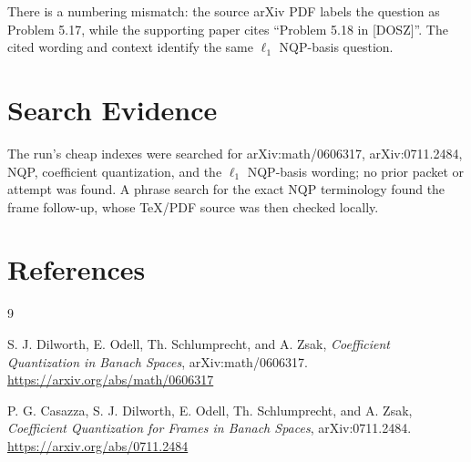 \documentclass[11pt]{article}
\begin{document}
There is a numbering mismatch: the source arXiv PDF labels the question as
Problem 5.17, while the supporting paper cites ``Problem 5.18 in [DOSZ]''.
The cited wording and context identify the same \(\ell_1\) NQP-basis question.

\section*{Search Evidence}

The run's cheap indexes were searched for arXiv:math/0606317, arXiv:0711.2484,
NQP, coefficient quantization, and the \(\ell_1\) NQP-basis wording; no prior
packet or attempt was found. A phrase search for the exact NQP terminology
found the frame follow-up, whose TeX/PDF source was then checked locally.

\section*{References}

\begin{thebibliography}{9}

S. J. Dilworth, E. Odell, Th. Schlumprecht, and A. Zsak,
\emph{Coefficient Quantization in Banach Spaces},
arXiv:math/0606317.
\url{https://arxiv.org/abs/math/0606317}

P. G. Casazza, S. J. Dilworth, E. Odell, Th. Schlumprecht, and A. Zsak,
\emph{Coefficient Quantization for Frames in Banach Spaces},
arXiv:0711.2484.
\url{https://arxiv.org/abs/0711.2484}

\end{thebibliography}
\end{document}
